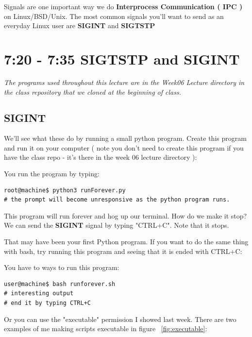 \documentclass[8pt]{article}
\begin{document}
 Signals are one important way we do \textbf{Interprocess Communication ( IPC )} on
Linux/BSD/Unix. The most common signals you'll want to send as an everyday Linux
user are \textbf{SIGINT} and \textbf{SIGTSTP}

\section{7:20 - 7:35 SIGTSTP and SIGINT}

\textit{The programs used throughout this lecture are in the Week06 Lecture directory in
the class repository that we  cloned at the beginning of class. }

\subsection{SIGINT}
We'll see what these do by running a small python program. Create this program
and run it on your computer ( note you don't need to create this program if you
have the class repo - it's there in the week 06 lecture directory ):



You run the program by typing:

\begin{lstlisting}[style=term]
root@machine$ python3 runForever.py
# the prompt will become unresponsive as the python program runs.
\end{lstlisting}

This program will run forever and hog up our terminal. How do we make it stop? We can send the \textbf{SIGINT} signal by typing "CTRL+C". Note that it stops. 

That may have been your first Python program. If you want to do the same thing
with bash, try running this program and seeing that it is ended with CTRL+C:



You have to ways to run this program:

\begin{lstlisting}[style=term]
user@machine$ bash runforever.sh
# interesting output
# end it by typing CTRL+C
\end{lstlisting}

Or you can use the "executable" permission I showed last week. There are two
examples of me making scripts executable in figure ~\ref{fig:executable}:
\end{document}
